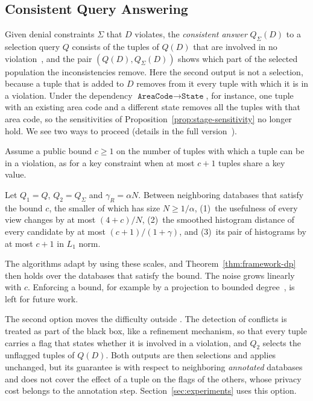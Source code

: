 \subsection{Consistent Query Answering}
\label{subsec:ext-cqa}

Given denial constraints $\Sigma$ that $D$ violates, the \emph{consistent answer} $Q_\Sigma(D)$ to a selection query $Q$ consists of the tuples of $Q(D)$ that are involved in no violation~\cite{arenas1999,bertossi2011,chomicki2004}, and the pair $(Q(D),Q_\Sigma(D))$ shows which part of the selected population the inconsistencies remove.
Here the second output is not a selection, because a tuple that is added to $D$ removes from it every tuple with which it is in a violation.
Under the dependency $\texttt{AreaCode}\to\texttt{State}$, for instance, one tuple with an existing area code and a different state removes all the tuples with that area code, so the sensitivities of Proposition~\ref{prop:stage-sensitivity} no longer hold.
We see two ways to proceed (details in \ifpaper the full version~\cite{fullversion}\else {}\fi).

Assume a public bound $c\ge1$ on the number of tuples with which a tuple can be in a violation, as for a key constraint when at most $c+1$ tuples share a key value.

\begin{proposition}
\label{prop:cqa-sensitivity}
Let $Q_1=Q$, $Q_2=Q_\Sigma$ and $\gamma_R=\alpha N$.
Between neighboring databases that satisfy the bound $c$, the smaller of which has size $N\ge1/\alpha$, (1)~the usefulness of every view changes by at most $(4+c)/N$, (2)~the smoothed histogram distance of every candidate by at most $(c+1)/(1+\gamma)$, and (3)~its pair of histograms by at most $c+1$ in $L_1$ norm.
\end{proposition}

The algorithms adapt by using these scales, and Theorem~\ref{thm:framework-dp} then holds over the databases that satisfy the bound.
The noise grows linearly with $c$.
Enforcing a bound, for example by a projection to bounded degree~\cite{KasiviswanathanNRS13,DayLL16,MohapatraGHK25}, is left for future work.

The second option moves the difficulty outside \sys{}.
The detection of conflicts is treated as part of the black box, like a refinement mechanism, so that every tuple carries a flag that states whether it is involved in a violation, and $Q_2$ selects the unflagged tuples of $Q(D)$.
Both outputs are then selections and \sys{} applies unchanged, but its guarantee is with respect to neighboring \emph{annotated} databases and does not cover the effect of a tuple on the flags of the others, whose privacy cost belongs to the annotation step.
Section~\ref{sec:experiments} uses this option.
